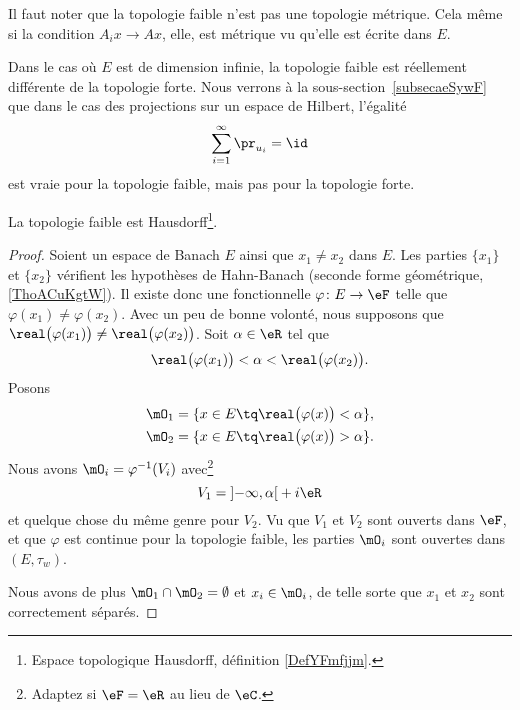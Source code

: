 \begin{remark}
	Il faut noter que la topologie faible n'est pas une topologie métrique. Cela même si la condition \( A_ix\to Ax\), elle, est métrique vu qu'elle est écrite dans \( E\).

	Dans le cas où \( E\) est de dimension infinie, la topologie faible est réellement différente de la topologie forte. Nous verrons à la sous-section~\ref{subsecaeSywF} que dans le cas des projections sur un espace de Hilbert, l'égalité
	\begin{equation}
		\sum_{i=1}^{\infty}\pr_{u_i}=\id
	\end{equation}
	est vraie pour la topologie faible, mais pas pour la topologie forte.
\end{remark}

\begin{lemma}
	La topologie faible est Hausdorff\footnote{Espace topologique Hausdorff, définition \ref{DefYFmfjjm}.}.
\end{lemma}

\begin{proof}
	Soient un espace de Banach \( E\) ainsi que \( x_1\neq x_2\) dans \( E\). Les parties \( \{ x_1 \}\) et \( \{ x_2 \}\) vérifient les hypothèses de Hahn-Banach (seconde forme géométrique, \ref{ThoACuKgtW}). Il existe donc une fonctionnelle \( \varphi\colon E\to \eF\) telle que \( \varphi(x_1)\neq \varphi(x_2)\). Avec un peu de bonne volonté, nous supposons que \( \real\big( \varphi(x_1) \big)\neq \real\big( \varphi(x_2) \big)\). Soit \( \alpha\in \eR\) tel que
	\begin{equation}
		\real\big( \varphi(x_1) \big)<\alpha <\real\big( \varphi(x_2) \big).
	\end{equation}
	Posons
	\begin{subequations}
		\begin{align}
			\mO_1 & =\{ x\in E\tq\real\big( \varphi(x) \big)< \alpha \}, \\
			\mO_2 & =\{ x\in E\tq\real\big( \varphi(x) \big)> \alpha \}.
		\end{align}
	\end{subequations}
	Nous avons \( \mO_i=\varphi^{-1}(V_i)\) avec\footnote{Adaptez si \( \eF=\eR\) au lieu de \( \eC\).}
	\begin{equation}
		V_1= \mathopen] -\infty , \alpha \mathclose[+i\eR
	\end{equation}
	et quelque chose du même genre pour \( V_2\). Vu que \( V_1\) et \( V_2\) sont ouverts dans \( \eF\), et que \( \varphi\) est continue pour la topologie faible, les parties \( \mO_i\) sont ouvertes dans \( (E,\tau_w)\).

	Nous avons de plus \( \mO_1\cap\mO_2=\emptyset\) et \( x_i\in \mO_i\), de telle sorte que \( x_1\) et \( x_2\) sont correctement séparés.
\end{proof}

